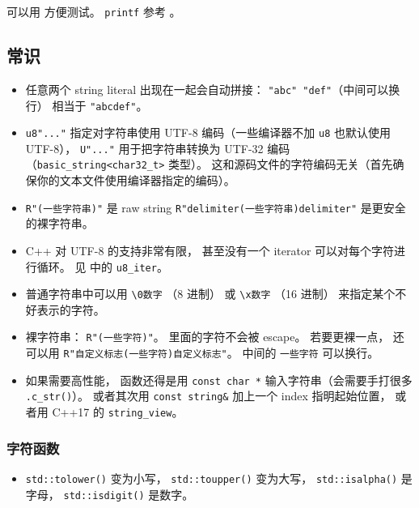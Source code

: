 
可以用  方便测试。 \verb|printf| 参考 。

\subsection{常识}
\begin{itemize}
\item 任意两个 string literal 出现在一起会自动拼接： \verb`"abc" "def"`（中间可以换行） 相当于 \verb|"abcdef"|。
\item \verb|u8"..."| 指定对字符串使用 UTF-8 编码（一些编译器不加 \verb|u8| 也默认使用 UTF-8）， \verb|U"..."| 用于把字符串转换为 UTF-32 编码（\verb|basic_string<char32_t>| 类型）。 这和源码文件的字符编码无关（首先确保你的文本文件使用编译器指定的编码）。
\item \verb|R"(一些字符串)"| 是 raw string \verb|R"delimiter(一些字符串)delimiter"| 是更安全的裸字符串。
\item C++ 对 UTF-8 的支持非常有限， 甚至没有一个 iterator 可以对每个字符进行循环。 见  中的 \verb|u8_iter|。
\item 普通字符串中可以用 \verb|\0数字| （8 进制） 或 \verb|\x数字| （16 进制） 来指定某个不好表示的字符。
\item 裸字符串： \verb|R"(一些字符)"|。 里面的字符不会被 escape。 若要更裸一点， 还可以用 \verb|R"自定义标志(一些字符)自定义标志"|。 中间的 \verb|一些字符| 可以换行。
\item 如果需要高性能， 函数还得是用 \verb|const char *| 输入字符串（会需要手打很多 \verb|.c_str()|）。 或者其次用 \verb|const string&| 加上一个 index 指明起始位置， 或者用 C++17 的 \verb|string_view|。
\end{itemize}

\subsubsection{字符函数}
\begin{itemize}
\item \verb|std::tolower()| 变为小写， \verb|std::toupper()| 变为大写， \verb|std::isalpha()| 是字母， \verb|std::isdigit()| 是数字。
\end{itemize}


